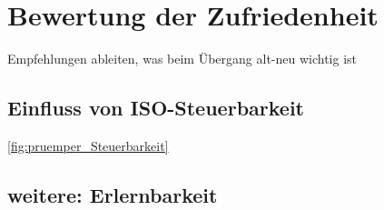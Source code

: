 \section{Bewertung der Zufriedenheit}
Empfehlungen ableiten, was beim Übergang alt-neu wichtig ist




\subsection*{Einfluss von ISO-Steuerbarkeit}
\autoref{fig:pruemper_Steuerbarkeit}

\subsection*{weitere: Erlernbarkeit}
